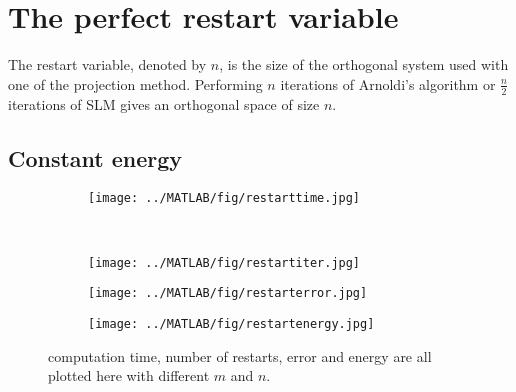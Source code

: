 \section{The perfect restart variable}%
The restart variable, denoted by $n$, is the size of the orthogonal system used with one of the projection method. Performing $n$ iterations of Arnoldi's algorithm or $\frac{n}{2}$ iterations of SLM gives an orthogonal space of size $n$.

\subsection{Constant energy}
\begin{figure}[H]
        \centering
        \begin{subfigure}[b]{0.45\textwidth}
                \texttt{[image: ../MATLAB/fig/restarttime.jpg]}
                \caption{  }
                \label{fig:restarttime}
        \end{subfigure}
        ~
        \begin{subfigure}[b]{0.45\textwidth}
                \texttt{[image: ../MATLAB/fig/restartiter.jpg]}
                \caption{  }
                \label{fig:restartiter}
        \end{subfigure}
        \begin{subfigure}[b]{0.45\textwidth}
                \texttt{[image: ../MATLAB/fig/restarterror.jpg]}
                \caption{  }
                \label{fig:restarterror}
        \end{subfigure}
        \begin{subfigure}[b]{0.45\textwidth}
                \texttt{[image: ../MATLAB/fig/restartenergy.jpg]}
                \caption{  }
                \label{fig:restartenergy}
        \end{subfigure}
        \caption{ computation time, number of restarts, error and energy are all plotted here with different $m$ and $n$. }
        \label{fig:restart}
\end{figure}

